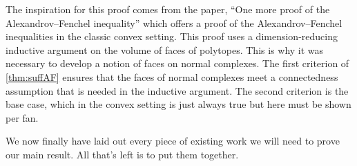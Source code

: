 \documentclass[12pt,oneside]{../../sfsuthesis}
\begin{document}
The inspiration for this proof comes from the paper, ``One more proof of the Alexandrov--Fenchel inequality'' \cite{cordero-erausquinOneMoreProof2019} which offers a proof of the Alexandrov--Fenchel inequalities in the classic convex setting.
This proof uses a dimension-reducing inductive argument on the volume of faces of polytopes.
This is why it was necessary to develop a notion of faces on normal complexes.
The first criterion of \th\ref{thm:suffAF} ensures that the faces of normal complexes meet a connectedness assumption that is needed in the inductive argument.
The second criterion is the base case, which in the convex setting is just always true but here must be shown per fan.

We now finally have laid out every piece of existing work we will need to prove our main result.
All that's left is to put them together.
\end{document}
